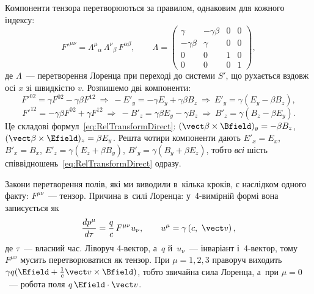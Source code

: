 \begin{Extra}
 Компоненти тензора перетворюються за правилом, однаковим для
кожного індексу:
\begin{equation*}
	F'^{\mu\nu} = \Lambda^\mu{}_\alpha\,\Lambda^\nu{}_\beta\,F^{\alpha\beta}, \qquad
	\Lambda =
	\begin{pmatrix}
		\gamma       & -\gamma\beta & 0 & 0 \\
		-\gamma\beta & \gamma       & 0 & 0 \\
		0            & 0            & 1 & 0 \\
		0            & 0            & 0 & 1
	\end{pmatrix},
\end{equation*}
де $\Lambda$~--- перетворення Лоренца при переході до системи $S'$, що рухається вздовж
осі $x$ зі швидкістю $v$. Розпишемо дві компоненти:
\begin{equation*}
	F'^{02} = \gamma F^{02} - \gamma\beta F^{12} \ \Rightarrow\ -E'_y = -\gamma E_y +
	\gamma\beta B_z \ \Rightarrow\ E'_y = \gamma\left(E_y - \beta B_z\right),
\end{equation*}
\begin{equation*}
	F'^{12} = -\gamma\beta F^{02} + \gamma F^{12} \ \Rightarrow\ -B'_z = \gamma\beta E_y -
	\gamma B_z \ \Rightarrow\ B'_z = \gamma\left(B_z - \beta E_y\right).
\end{equation*}
Це складові формул~\eqref{eq:RelTransformDirect}: $(\vect\beta\times\Bfield)_y = -\beta
B_z$, $(\vect\beta\times\Efield)_z = \beta E_y$. Решта чотири компоненти дають $E'_x =
E_x$, $B'_x = B_x$, $E'_z = \gamma(E_z + \beta B_y)$, $B'_y = \gamma(B_y + \beta E_z)$,
тобто \emph{всі} шість співвідношень~\eqref{eq:RelTransformDirect} одразу.

	Закони перетворення полів, які ми виводили в~кілька кроків, є наслідком одного факту:
	$F^{\mu\nu}$~--- тензор. Причина в~силі Лоренца: у~4-вимірній формі вона записується
	як
	\begin{equation*}
		\frac{dp^\mu}{d\tau} = \frac qc\,F^{\mu\nu}u_\nu, \qquad u^\mu = \gamma\left(c,\
		\vect v\right),
	\end{equation*}
	де $\tau$~--- власний час. Ліворуч 4-вектор, а~$q$ й~$u_\nu$~--- інваріант і~4-вектор,
	тому $F^{\mu\nu}$ мусить перетворюватися як тензор. При $\mu = 1,2,3$ праворуч
	виходить $\gamma q(\Efield + \frac1c\vect v\times\Bfield)$, тобто звичайна сила
	Лоренца, а~при $\mu = 0$~--- робота поля $q\,\Efield\cdot\vect v$.


\end{Extra}
